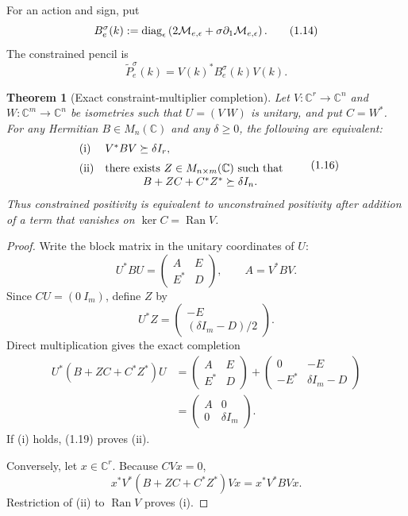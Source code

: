 \documentclass[11pt,oneside]{article}
\newtheorem{theorem}{Theorem}[section]
\theoremstyle{definition}
\theoremstyle{remark}
\newcommand{\Ran}{\operatorname{Ran}}
\begin{document}
For an action and sign, put
\[
 B_e^\sigma(k)
 :=
 \operatorname{diag}_\epsilon
 \left(2{\cal M}_{e,\epsilon}
       +\sigma\partial_1{\cal M}_{e,\epsilon}\right).
                                                                  \tag{1.14}
\]
The constrained pencil is
\[
 \widetilde P_e^\sigma(k)=V(k)^*B_e^\sigma(k)V(k).         \tag{1.15}
\]

\begin{theorem}[Exact constraint-multiplier completion]
\label{thm:newv1-multiplier}
Let \(V:\mathbb C^r\to\mathbb C^n\) and
\(W:\mathbb C^m\to\mathbb C^n\) be isometries such that
\(U=(V\ W)\) is unitary, and put \(C=W^*\).
For any Hermitian \(B\in M_n(\mathbb C)\) and any
\(\delta\ge0\), the following are equivalent:
\[
\begin{array}{ll}
\textup{(i)}&V^*BV\succeq\delta I_r,\\[2mm]
\textup{(ii)}&
\text{there exists }Z\in M_{n\times m}(\mathbb C)\text{ such that}\\
&\hspace{12mm}B+ZC+C^*Z^*\succeq\delta I_n.
\end{array}                                                  \tag{1.16}
\]
Thus constrained positivity is equivalent to unconstrained
positivity after addition of a term that vanishes on
\(\ker C=\Ran V\).
\end{theorem}

\begin{proof}
Write the block matrix in the unitary coordinates of \(U\):
\[
 U^*BU=
 \begin{pmatrix}
 A&E\\ E^*&D
 \end{pmatrix},
 \qquad A=V^*BV.                                           \tag{1.17}
\]
Since \(CU=(0\ I_m)\), define \(Z\) by
\[
 U^*Z=
 \begin{pmatrix}
 -E\\[1mm](\delta I_m-D)/2
 \end{pmatrix}.                                             \tag{1.18}
\]
Direct multiplication gives the exact completion
\[
\begin{split}
 U^*(B+ZC+C^*Z^*)U
 &=
 \begin{pmatrix}
 A&E\\E^*&D
 \end{pmatrix}
 +
 \begin{pmatrix}
 0&-E\\-E^*&\delta I_m-D
 \end{pmatrix}\\
 &=
 \begin{pmatrix}
 A&0\\0&\delta I_m
 \end{pmatrix}.
\end{split}                                                  \tag{1.19}
\]
If (i) holds, (1.19) proves (ii).

Conversely, let \(x\in\mathbb C^r\).  Because \(CVx=0\),
\[
 x^*V^*(B+ZC+C^*Z^*)Vx=x^*V^*BVx.                         \tag{1.20}
\]
Restriction of (ii) to \(\Ran V\) proves (i).
\end{proof}
\end{document}
